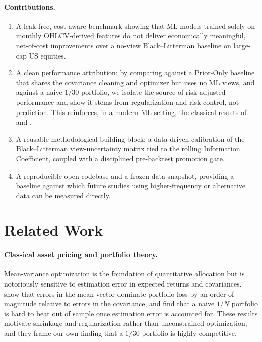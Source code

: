 \documentclass[11pt]{article}
\begin{document}
\paragraph{Contributions.}
\begin{enumerate}
  \item A leak-free, cost-aware benchmark showing that ML models trained solely on monthly
  OHLCV-derived features do not deliver economically meaningful, net-of-cost improvements over a
  no-view Black--Litterman baseline on large-cap US equities.
  \item A clean performance attribution: by comparing against a Prior-Only baseline that shares
  the covariance cleaning and optimizer but uses no ML views, and against a naive $1/30$
  portfolio, we isolate the source of risk-adjusted performance and show it stems from
  regularization and risk control, not prediction. This reinforces, in a modern ML setting, the
  classical results of \citet{chopra1993effect} and \citet{demiguel2009optimal}.
  \item A reusable methodological building block: a data-driven calibration of the
  Black--Litterman view-uncertainty matrix tied to the rolling Information Coefficient, coupled
  with a disciplined pre-backtest promotion gate.
  \item A reproducible open codebase and a frozen data snapshot, providing a baseline against
  which future studies using higher-frequency or alternative data can be measured directly.
\end{enumerate}

\section{Related Work}
\paragraph{Classical asset pricing and portfolio theory.}
Mean-variance optimization \citep{markowitz1952portfolio} is the foundation of quantitative
allocation but is notoriously sensitive to estimation error in expected returns and covariances.
\citet{chopra1993effect} show that errors in the mean vector dominate portfolio loss by an order
of magnitude relative to errors in the covariance, and \citet{demiguel2009optimal} find that a
naive $1/N$ portfolio is hard to beat out of sample once estimation error is accounted for. These
results motivate shrinkage and regularization rather than unconstrained optimization, and they
frame our own finding that a $1/30$ portfolio is highly competitive.
\end{document}

